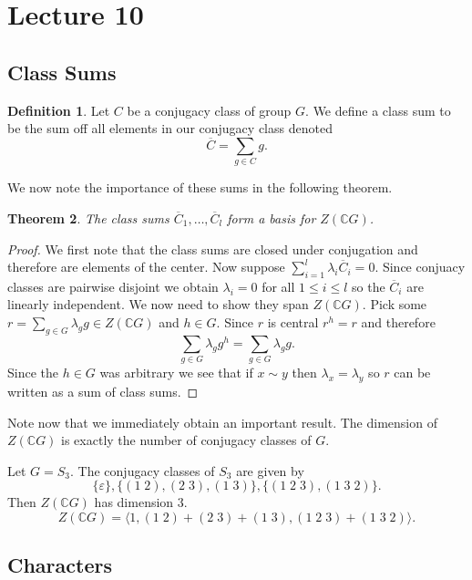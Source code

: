 \documentclass[11pt, notitlepage]{article}
\numberwithin{equation}{section}
\theoremstyle{plain}
\newtheorem{theorem}{Theorem}[section]
\theoremstyle{definition}
\newtheorem{definition}[theorem]{Definition}
\newenvironment{example}
	{\pushQED{\qed}\renewcommand{\qedsymbol}{$\blacktriangleleft$}\examplex}
	{\popQED\endexamplex}
\begin{document}
\section{Lecture 10}


\subsection{Class Sums}

\begin{definition}
Let $C$ be a conjugacy class of group $G$. We define a class sum to be the sum off all elements in our conjugacy class denoted
\[
	\overline C = \sum_{g\in C}g.
\]
\end{definition}

We now note the importance of these sums in the following theorem.

\begin{theorem}
The class sums $\overline C_1, \ldots, \overline C_l$ form a basis for $Z(\mathbb{C}G)$.
\end{theorem}

\begin{proof}
	We first note that the class sums are closed under conjugation and therefore are elements of the center. Now suppose $\sum_{i=1}^l\lambda_i\overline C_i = 0$. Since conjuacy classes are pairwise disjoint we obtain $\lambda_i = 0$ for all $1\leq i \leq l$ so the $\overline C_i$ are linearly independent. We now need to show they span $Z(\mathbb{C}G)$. Pick some $r = \sum_{g\in G}\lambda_gg \in Z(\mathbb{C}G)$ and $h\in G$. Since $r$ is central $r^h = r$ and therefore
	\[
		\sum_{g\in G}\lambda_g g^h= \sum_{g\in G}\lambda_g g.
	\]
	Since the $h\in G$ was arbitrary we see that if $x\sim y$ then $\lambda_x = \lambda_y$ so $r$ can be written as a sum of class sums.
\end{proof}

Note now that we immediately obtain an important result. The dimension of $Z(\mathbb{C}G)$ is exactly the number of conjugacy classes of $G$.

\begin{example}
Let $G = S_3$. The conjugacy classes of $S_3$ are given by
\[
	\{\varepsilon\}, \{(1\;2), (2\;3), (1\;3)\}, \{(1\;2\;3), (1\;3\;2)\}.
\]
Then $Z(\mathbb{C}G)$ has dimension 3.
\[
	Z(\mathbb{C}G) = \langle 1, (1\;2) + (2\;3) +(1\;3), (1\;2\;3) + (1\;3\;2) \rangle.
\]
\end{example}



\subsection{Characters}
\end{document}
